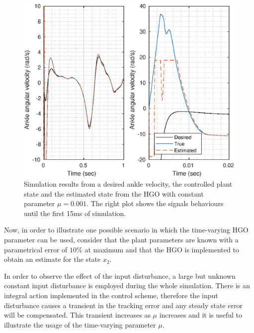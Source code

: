 \documentclass[letterpaper, 10 pt, journal, twocolumn]{IEEEtran}  %
\theoremstyle{plain}
\theoremstyle{definition}
\theoremstyle{remark}
\begin{document}
%
%
\begin{figure}[h!]
	\begin{center}
	\includegraphics[width = 13cm]{Figs/dq_ankle_mu_1e-03.eps}
	\caption{Simulation results from a desired ankle velocity, the controlled plant state and the estimated state from the HGO with constant parameter $\mu=0.001$. The right plot shows the signals behaviours until the first 15ms of simulation.}
	\label{fig:dankle}
	\end{center}
\end{figure}
%
%
Now, in order to illustrate one possible scenario in which the time-varying HGO parameter can be used, consider that the plant parameters are known with a parametrical error of $10\%$ at maximum and that the HGO is implemented to obtain an estimate for the state $x_2$. 


In order to observe the effect of the input disturbance, a large but unknown constant input disturbance is employed during the whole simulation. There is an integral action implemented in the control scheme, therefore the input disturbance causes a transient in the tracking error and any steady state error will be compensated. This transient increases as $\mu$ increases and it is useful to illustrate the usage of the time-varying parameter $\mu$.
\end{document}
